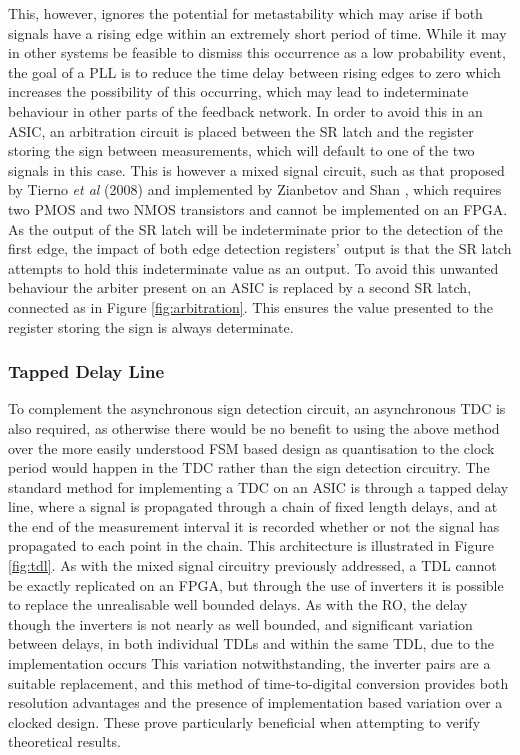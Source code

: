 This, however, ignores the potential for metastability which may arise if both signals have a rising edge within an extremely short period of time. While it may in other systems be feasible to dismiss this occurrence as a low probability event, the goal of a \ac{PLL} is to reduce the time delay between rising edges to zero which increases the possibility of this occurring, which may lead to indeterminate behaviour in other parts of the feedback network. In order to avoid this in an \ac{ASIC}, an arbitration circuit is placed between the \ac{SR} latch and the register storing the sign between measurements, which will default to one of the two signals in this case. This is however a mixed signal circuit, such as that proposed by Tierno \textit{et al} (2008) and implemented by Zianbetov and Shan \cite{tierno2008wide,zianbetov2013phd,shan2014phd}, which requires two \ac{PMOS} and two \ac{NMOS} transistors and cannot be implemented on an \ac{FPGA}. As the output of the \ac{SR} latch will be indeterminate prior to the detection of the first edge, the impact of both edge detection registers' output is that the \ac{SR} latch attempts to hold this indeterminate value as an output. To avoid this unwanted behaviour the arbiter present on an \ac{ASIC} is replaced by a second \ac{SR} latch, connected as in Figure \ref{fig:arbitration}. This ensures the value presented to the register storing the sign is always determinate.

\subsubsection{Tapped Delay Line}
To complement the asynchronous sign detection circuit, an asynchronous \ac{TDC} is also required, as otherwise there would be no benefit to using the above method over the more easily understood \ac{FSM} based design as quantisation to the clock period would happen in the \ac{TDC} rather than the sign detection circuitry. The standard method for implementing a \ac{TDC} on an \ac{ASIC} is through a tapped delay line, where a signal is propagated through a chain of fixed length delays, and at the end of the measurement interval it is recorded whether or not the signal has propagated to each point in the chain. This architecture is illustrated in Figure \ref{fig:tdl}. As with the mixed signal circuitry previously addressed, a \ac{TDL} cannot be exactly replicated on an \ac{FPGA}, but through the use of inverters it is possible to replace the unrealisable well bounded delays. As with the \ac{RO}, the delay though the inverters is not nearly as well bounded, and significant variation between delays, in both individual \ac{TDL}s and within the same \ac{TDL}, due to the implementation occurs This variation notwithstanding, the inverter pairs are a suitable replacement, and this method of time-to-digital conversion provides both resolution advantages and the presence of implementation based variation over a clocked design. These prove particularly beneficial when attempting to verify theoretical results.

